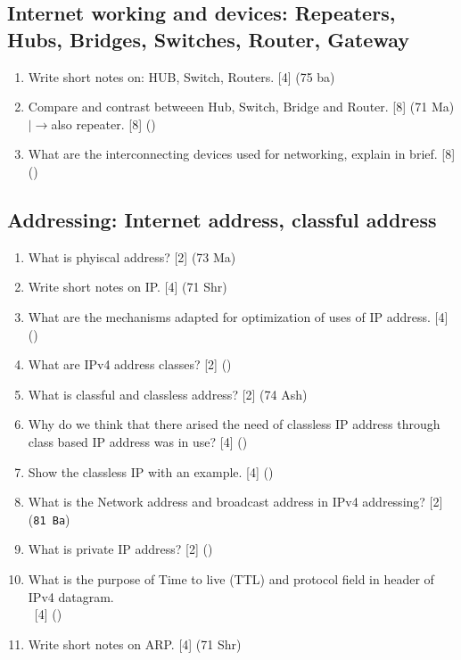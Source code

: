 \documentclass[12pt]{article}
\newcommand{\lb}{\\$\left|\rightarrow\right.$}
\newcommand{\enter}{\\\textcolor{white}{1}}
\begin{document}
	\subsection{Internet working and devices: Repeaters, Hubs, Bridges, Switches, Router, Gateway}
		\begin{enumerate}[noitemsep, topsep=0pt]
			\item Write short notes on: HUB, Switch, Routers. \hfill [4] (75 ba)

			\item Compare and contrast betweeen Hub, Switch, Bridge and Router. \hfill [8] (71 Ma)
			\lb also repeater. \hfill [8] ()

			\item What are the interconnecting devices used for networking, explain in brief. \hfill [8] ()
		\end{enumerate}
	\subsection{Addressing: Internet address, classful address}
		\begin{enumerate}[noitemsep, topsep=0pt]
			\item What is phyiscal address? \hfill [2] (73 Ma)

			\item Write short notes on IP. \hfill [4] (71 Shr)

			\item What are the mechanisms adapted for optimization of uses of IP address. \hfill [4] ()

			\item What are IPv4 address classes? \hfill [2] ()

			\item What is classful and classless address? \hfill [2] (74 Ash)

			\item Why do we think that there arised the need of classless IP address through class based IP address was in use? \hfill [4] ()

			\item Show the classless IP with an example. \hfill [4] ()

			\item What is the Network address and broadcast address in IPv4 addressing? \hfill [2] (\texttt{81 Ba})

			\item What is private IP address? \hfill [2] ()

			\item What is the purpose of Time to live (TTL) and protocol field in header of IPv4 datagram.
			\enter\hfill [4] ()

			\item Write short notes on ARP. \hfill [4] (71 Shr)
		\end{enumerate}
\end{document}
